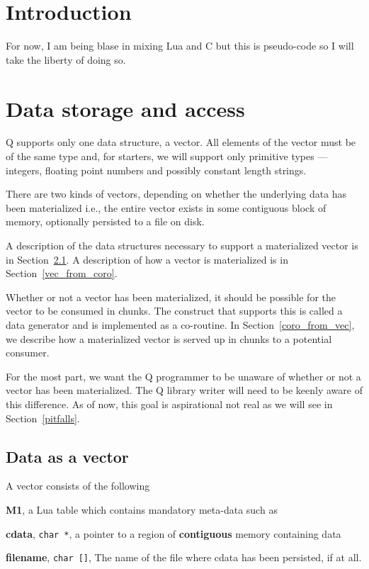 \newcommand{\Assign}{\verb+:=+ }

\section{Introduction}

For now, I am being blase in mixing Lua and C but this is pseudo-code 
so I will take the liberty of doing so.

\TBC


\section{Data storage and access}

Q supports only one data structure, a vector. All elements of the vector must be
of the same type and, for starters, we will support only primitive types ---
integers, floating point numbers and possibly constant length strings.

There are two kinds of vectors, depending on whether the underlying data has
been materialized i.e., the entire vector exists in some contiguous block of
memory, optionally persisted to a file on disk.

A description of the data structures necessary to support a materialized vector
is in Section~\ref{data_vector}. A description of how a vector is materialized
is in Section~\ref{vec_from_coro}.

Whether or not a vector has been materialized, it should be possible for the
vector to be consumed in chunks. The construct that supports this is called a
data generator and is implemented as a co-routine. In
Section~\ref{coro_from_vec}, we describe how a materialized vector is served up
in chunks to a potential consumer.

For the most part, we want the Q programmer to be unaware of whether or not 
a vector has been materialized. The Q library writer will need to be keenly
aware of this difference. As of now, this goal is aspirational not real as we
will see in Section~\ref{pitfalls}.


\subsection{Data as a vector}
\label{data_vector}

A vector consists of the following
\be
\item {\bf M1}, a Lua table which contains mandatory meta-data such as 
\be
\item {\bf cdata}, \verb+char *+, a pointer to a region of {\bf contiguous} memory
containing data 
\item {\bf filename}, \verb+char []+, The name of the file where cdata has been
persisted, if at all. 

